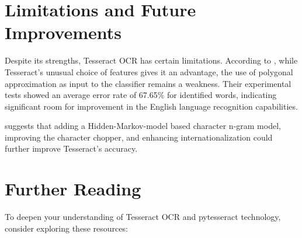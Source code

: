 \documentclass{article}
\begin{document}
	\section{Limitations and Future Improvements}
	
	Despite its strengths, Tesseract OCR has certain limitations. According to \citet{Joshi:2021}, while Tesseract's unusual choice of features gives it an advantage, the use of polygonal approximation as input to the classifier remains a weakness. Their experimental tests showed an average error rate of 67.65\% for identified words, indicating significant room for improvement in the English language recognition capabilities.
	
	\citet{Joshi:2021} suggests that adding a Hidden-Markov-model based character n-gram model, improving the character chopper, and enhancing internationalization could further improve Tesseract's accuracy.
	
	\section{Further Reading}
	
	To deepen your understanding of Tesseract OCR and pytesseract technology, consider exploring these resources:
	
\end{document}
